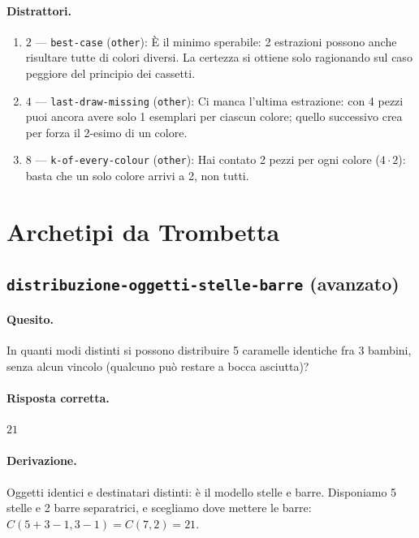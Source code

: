 \paragraph{Distrattori.}
\begin{enumerate}
  \item $2$ --- \texttt{best-case} (\texttt{other}): È il minimo sperabile: 2 estrazioni possono anche risultare tutte di colori diversi. La certezza si ottiene solo ragionando sul caso peggiore del principio dei cassetti.
  \item $4$ --- \texttt{last-draw-missing} (\texttt{other}): Ci manca l'ultima estrazione: con 4 pezzi puoi ancora avere solo 1 esemplari per ciascun colore; quello successivo crea per forza il 2-esimo di un colore.
  \item $8$ --- \texttt{k-of-every-colour} (\texttt{other}): Hai contato 2 pezzi per ogni colore ($4 \cdot  2$): basta che un solo colore arrivi a 2, non tutti.
\end{enumerate}

\section{Archetipi da Trombetta}

\subsection{\texorpdfstring{\texttt{distribuzione-oggetti-stelle-barre} (avanzato)}{distribuzione-oggetti-stelle-barre (avanzato)}}

\paragraph{Quesito.} In quanti modi distinti si possono distribuire 5 caramelle identiche fra 3 bambini, senza alcun vincolo (qualcuno può restare a bocca asciutta)?

\paragraph{Risposta corretta.} $21$

\paragraph{Derivazione.} Oggetti identici e destinatari distinti: è il modello \guillemotleft{}stelle e barre\guillemotright{}. Disponiamo 5 stelle e 2 barre separatrici, e scegliamo dove mettere le barre: $C(5 + 3 - 1, 3 - 1) = C(7, 2) = 21$.

